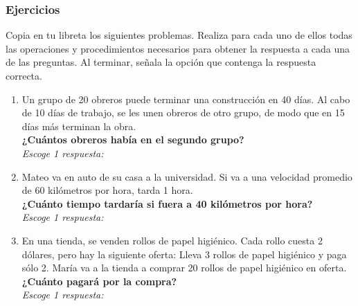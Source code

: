 \documentclass[11pt]{book}
\begin{document}
\subsubsection{Ejercicios}
Copia en tu libreta los siguientes problemas. Realiza para cada uno de ellos todas las operaciones y
procedimientos necesarios para obtener la respuesta a cada una de las preguntas. Al terminar, señala la
opción que contenga la respuesta correcta.
\begin{enumerate}%
  \item Un grupo de 20 obreros puede terminar una
        construcción en 40 días. Al cabo de 10 días de trabajo,
        se les unen obreros de otro grupo, de modo que en 15 días
        más terminan la obra.\\
        \textbf{¿Cuántos obreros había en el segundo grupo?}\\
        \emph{Escoge 1 respuesta:}\\

  \item Mateo va en auto de su casa a la universidad. Si va a una velocidad promedio de 60 kilómetros por hora, tarda 1 hora.\\
        \textbf{¿Cuánto tiempo tardaría si fuera a 40 kilómetros por hora?}\\
        \emph{Escoge 1 respuesta:}\\

  \item En una tienda, se venden rollos de papel higiénico. Cada rollo cuesta 2 dólares, pero hay la siguiente oferta:
        Lleva 3 rollos de papel higiénico y paga s\'olo 2.
        María va a la tienda a comprar 20 rollos de papel higiénico en oferta.\\
        \textbf{¿Cuánto pagará por la compra?}\\
        \emph{Escoge 1 respuesta:}\\


\end{enumerate}
\end{document}
